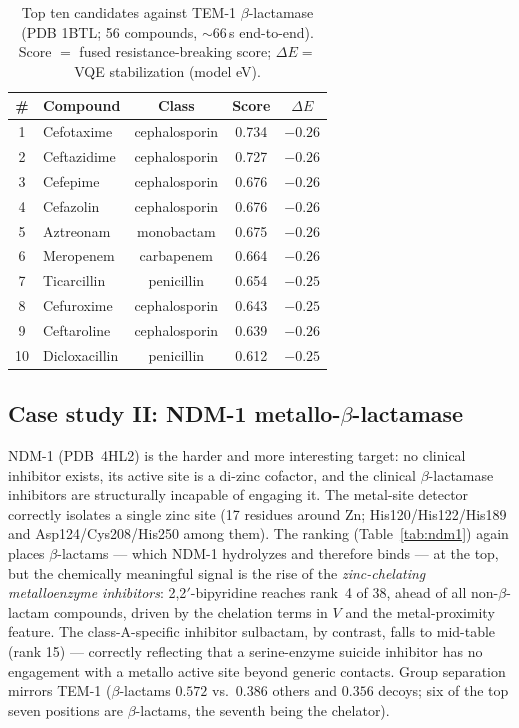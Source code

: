 \documentclass[10pt,twocolumn]{article}
\begin{document}
\begin{table}[t]
\centering
\small
\caption{Top ten candidates against TEM-1 $\beta$-lactamase (PDB 1BTL; 56 compounds,
$\sim$66\,s end-to-end). Score $=$ fused resistance-breaking score;
$\Delta E =$ VQE stabilization (model eV).}
\label{tab:tem1}
\begin{tabular*}{\columnwidth}{@{\extracolsep{\fill}}clccc@{}}
\toprule
\# & Compound & Class & Score & $\Delta E$ \\
\midrule
1 & Cefotaxime & cephalosporin & 0.734 & $-0.26$ \\
2 & Ceftazidime & cephalosporin & 0.727 & $-0.26$ \\
3 & Cefepime & cephalosporin & 0.676 & $-0.26$ \\
4 & Cefazolin & cephalosporin & 0.676 & $-0.26$ \\
5 & Aztreonam & monobactam & 0.675 & $-0.26$ \\
6 & Meropenem & carbapenem & 0.664 & $-0.26$ \\
7 & Ticarcillin & penicillin & 0.654 & $-0.25$ \\
8 & Cefuroxime & cephalosporin & 0.643 & $-0.25$ \\
9 & Ceftaroline & cephalosporin & 0.639 & $-0.26$ \\
10 & Dicloxacillin & penicillin & 0.612 & $-0.25$ \\
\bottomrule
\end{tabular*}
\end{table}

\subsection{Case study II: NDM-1 metallo-$\beta$-lactamase}

NDM-1 (PDB~4HL2) is the harder and more interesting target: no clinical inhibitor
exists, its active site is a di-zinc cofactor, and the clinical $\beta$-lactamase
inhibitors are structurally incapable of engaging it. The metal-site detector
correctly isolates a single zinc site (17 residues around Zn; His120/His122/His189 and
Asp124/Cys208/His250 among them). The ranking (Table~\ref{tab:ndm1}) again places
$\beta$-lactams --- which NDM-1 hydrolyzes and therefore binds --- at the top, but the
chemically meaningful signal is the rise of the \emph{zinc-chelating metalloenzyme
inhibitors}: 2,2$'$-bipyridine reaches rank~4 of 38, ahead of all non-$\beta$-lactam
compounds, driven by the chelation terms in $V$ and the metal-proximity feature. The
class-A-specific inhibitor sulbactam, by contrast, falls to mid-table (rank 15) ---
correctly reflecting that a serine-enzyme suicide inhibitor has no engagement with a
metallo active site beyond generic contacts. Group separation mirrors TEM-1
($\beta$-lactams $0.572$ vs.\ $0.386$ others and $0.356$ decoys; six of the top seven
positions are $\beta$-lactams, the seventh being the chelator).
\end{document}
